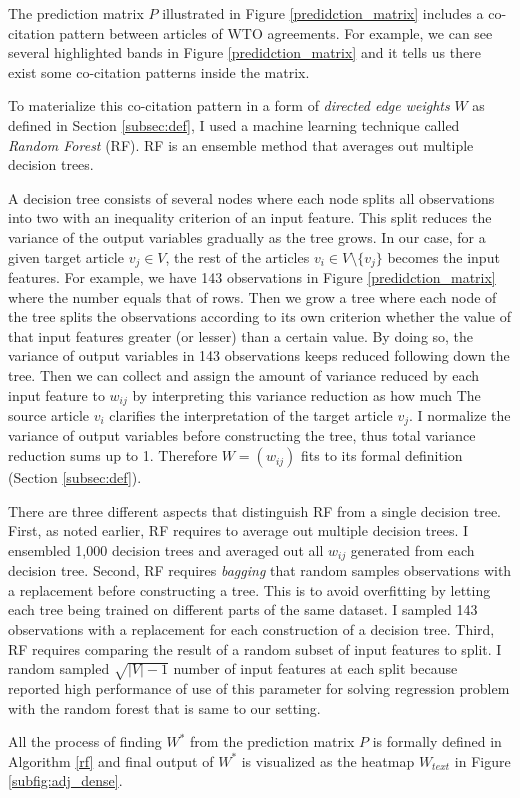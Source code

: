 The prediction matrix $P$ illustrated in Figure \ref{predidction_matrix}
includes a co-citation pattern between articles of WTO agreements. For example,
we can see several highlighted bands in Figure \ref{predidction_matrix}
and it tells us there exist some co-citation patterns inside the matrix.
 
To materialize this co-citation pattern in a form of \textit{directed edge weights} $W$ as defined in Section \ref{subsec:def},
I used a machine learning technique called \textit{Random Forest} (RF). RF is an ensemble method that averages out
multiple decision trees.
 
A decision tree consists of several nodes where each node splits all observations into two with an inequality criterion of an input feature.
This split reduces the variance of the output variables gradually as the tree grows.
In our case, for a given target article $v_j \in V$, the rest of the articles $v_i \in V \setminus \{v_j\}$ becomes the input features.
For example, we have 143 observations in Figure \ref{predidction_matrix} where the number equals that of rows.
Then we grow a tree where each node of the tree splits
the observations according to its own criterion
whether the value of that input features greater (or lesser) than a certain value.
By doing so,
the variance of output variables in 143 observations keeps reduced following down the tree.
Then we can collect and assign the amount of variance reduced by each input feature to $w_{ij}$
by interpreting this variance reduction as how much
The source article $v_i$ clarifies the interpretation of the target article $v_j$.
I normalize the variance of output variables before constructing the tree, thus total variance reduction
sums up to 1. Therefore $W = (w_{ij})$ fits to its formal definition (Section \ref{subsec:def}).
 
There are three different aspects that distinguish RF from a single decision tree.
First, as noted earlier, RF requires to average out multiple decision trees.
I ensembled 1,000 decision trees and averaged out all $w_{ij}$ generated from each decision tree.
Second, RF requires \textit{bagging} that random samples observations with a replacement before constructing a tree.
This is to avoid overfitting by letting each tree being trained on different parts of the same dataset.
I sampled 143 observations with a replacement for each construction of a decision tree.
Third, RF requires comparing the result of a random subset of input features to split.
I random sampled $\sqrt{|V|-1}$ number of input features at each split because \cite{genie3} reported high performance of use of this parameter for solving regression problem with the random forest that is same to our setting.
 
All the process of finding $W^*$ from the prediction matrix $P$ is formally defined in Algorithm \ref{rf} and final output of $W^*$ is visualized as the heatmap $W_{text}$ in Figure \ref{subfig:adj_dense}.
